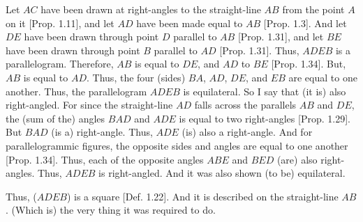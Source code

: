 \begin{Parallel}{}{}
{Let $AC$ have been drawn at right-angles to the straight-line $AB$
from the point $A$ on it [Prop. 1.11], and let $AD$ have been
made equal to $AB$ [Prop. 1.3]. And let $DE$ have been drawn
through point $D$ parallel to $AB$ [Prop. 1.31], and let $BE$ have been
drawn through point $B$ parallel to $AD$ [Prop. 1.31]. Thus,
$ADEB$ is a parallelogram. Therefore, $AB$ is equal to $DE$, and $AD$ to $BE$ [Prop. 1.34]. But, $AB$ is equal to $AD$. Thus, the four (sides) $BA$, $AD$, $DE$, and $EB$ are equal to one another. Thus, the parallelogram $ADEB$ is equilateral.
So I say that (it is) also right-angled. For since the straight-line $AD$ falls
across the parallels $AB$ and $DE$, the (sum of the) angles $BAD$ and $ADE$ is
equal to two right-angles [Prop. 1.29]. But $BAD$ (is a) right-angle. Thus,
$ADE$ (is) also a right-angle. And for parallelogrammic figures, the opposite
sides and angles are equal to one another [Prop. 1.34]. Thus, each of the
opposite angles $ABE$ and $BED$ (are) also right-angles. Thus, $ADEB$ is
right-angled. And it was also shown (to be) equilateral.

\epsfysize=2.5in
\centerline{}

Thus, ($ADEB$) is a square [Def. 1.22]. And it is described on the straight-line $AB$. (Which is) the very thing it was required to do.}
\end{Parallel}

